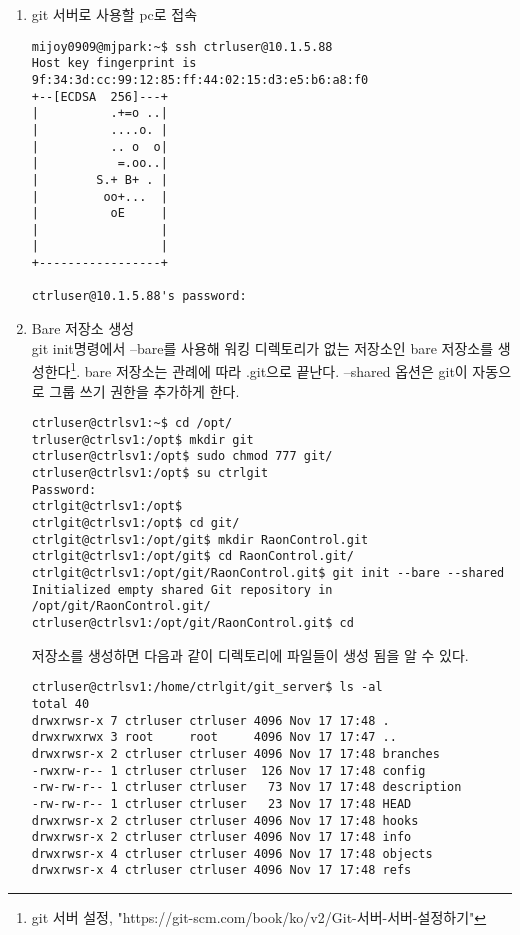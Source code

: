 \documentclass[11pt
  , a4paper
  , article
  , oneside
]{memoir}
\begin{document}
\begin{enumerate}
\item git 서버로 사용할 pc로 접속

\scriptsize
{
\begin{verbatim}
mijoy0909@mjpark:~$ ssh ctrluser@10.1.5.88
Host key fingerprint is 9f:34:3d:cc:99:12:85:ff:44:02:15:d3:e5:b6:a8:f0
+--[ECDSA  256]---+
|          .+=o ..|
|          ....o. |
|          .. o  o|
|           =.oo..|
|        S.+ B+ . |
|         oo+...  |
|          oE     |
|                 |
|                 |
+-----------------+

ctrluser@10.1.5.88's password: 
\end{verbatim}
}

\item Bare 저장소 생성\\
git init명령에서 --bare를 사용해 워킹 디렉토리가 없는 저장소인 bare 저장소를 생성한다\footnote{git 서버 설정, "https://git-scm.com/book/ko/v2/Git-서버-서버-설정하기"}. bare 저장소는 관례에 따라  .git으로 끝난다. --shared 옵션은 git이 자동으로 그룹 쓰기 권한을 추가하게 한다.

\scriptsize
{
\begin{verbatim}
ctrluser@ctrlsv1:~$ cd /opt/
trluser@ctrlsv1:/opt$ mkdir git
ctrluser@ctrlsv1:/opt$ sudo chmod 777 git/
ctrluser@ctrlsv1:/opt$ su ctrlgit
Password: 
ctrlgit@ctrlsv1:/opt$ 
ctrlgit@ctrlsv1:/opt$ cd git/
ctrlgit@ctrlsv1:/opt/git$ mkdir RaonControl.git
ctrlgit@ctrlsv1:/opt/git$ cd RaonControl.git/
ctrlgit@ctrlsv1:/opt/git/RaonControl.git$ git init --bare --shared
Initialized empty shared Git repository in /opt/git/RaonControl.git/
ctrluser@ctrlsv1:/opt/git/RaonControl.git$ cd
\end{verbatim}
}

저장소를 생성하면 다음과 같이 디렉토리에 파일들이 생성 됨을 알 수 있다.

\scriptsize
{
\begin{verbatim}
ctrluser@ctrlsv1:/home/ctrlgit/git_server$ ls -al
total 40
drwxrwsr-x 7 ctrluser ctrluser 4096 Nov 17 17:48 .
drwxrwxrwx 3 root     root     4096 Nov 17 17:47 ..
drwxrwsr-x 2 ctrluser ctrluser 4096 Nov 17 17:48 branches
-rwxrw-r-- 1 ctrluser ctrluser  126 Nov 17 17:48 config
-rw-rw-r-- 1 ctrluser ctrluser   73 Nov 17 17:48 description
-rw-rw-r-- 1 ctrluser ctrluser   23 Nov 17 17:48 HEAD
drwxrwsr-x 2 ctrluser ctrluser 4096 Nov 17 17:48 hooks
drwxrwsr-x 2 ctrluser ctrluser 4096 Nov 17 17:48 info
drwxrwsr-x 4 ctrluser ctrluser 4096 Nov 17 17:48 objects
drwxrwsr-x 4 ctrluser ctrluser 4096 Nov 17 17:48 refs
\end{verbatim}
}
\end{enumerate}
\end{document}
